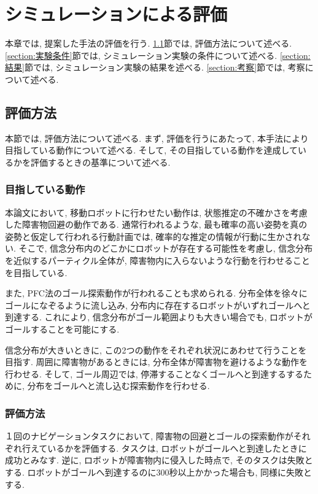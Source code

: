 \chapter{シミュレーションによる評価} \label{chapter:evaluate}
本章では, 提案した手法の評価を行う. 
\ref{section:評価方法}節では, 評価方法について述べる. 
\ref{section:実験条件}節では, シミュレーション実験の条件について述べる. 
\ref{section:結果}節では, シミュレーション実験の結果を述べる. 
\ref{section:考察}節では, 考察について述べる. 

\section{評価方法} \label{section:評価方法}
本節では, 評価方法について述べる. 
まず, 評価を行うにあたって, 本手法により目指している動作について述べる. 
そして, その目指している動作を達成しているかを評価するときの基準について述べる. 

\subsection{目指している動作}
本論文において, 移動ロボットに行わせたい動作は, 状態推定の不確かさを考慮した障害物回避の動作である. 
通常行われるような, 最も確率の高い姿勢を真の姿勢と仮定して行われる行動計画では, 確率的な推定の情報が行動に生かされない. 
そこで, 信念分布内のどこかにロボットが存在する可能性を考慮し, 
信念分布を近似するパーティクル全体が, 障害物内に入らないような行動を行わせることを目指している. 

また, PFC法のゴール探索動作が行われることも求められる. 
分布全体を徐々にゴールになぞるように流し込み, 分布内に存在するロボットがいずれゴールへと到達する. 
これにより, 信念分布がゴール範囲よりも大きい場合でも, ロボットがゴールすることを可能にする. 

信念分布が大きいときに, この2つの動作をそれぞれ状況にあわせて行うことを目指す. 
周囲に障害物があるときには, 分布全体が障害物を避けるような動作を行わせる. 
そして, ゴール周辺では, 停滞することなくゴールへと到達するするために, 分布をゴールへと流し込む探索動作を行わせる. 

\subsection{評価方法}
１回のナビゲーションタスクにおいて, 障害物の回避とゴールの探索動作がそれぞれ行えているかを評価する. 
タスクは, ロボットがゴールへと到達したときに成功とみなす. 
逆に, ロボットが障害物内に侵入した時点で, そのタスクは失敗とする. 
ロボットがゴールへ到達するのに300秒以上かかった場合も, 同様に失敗とする. 

